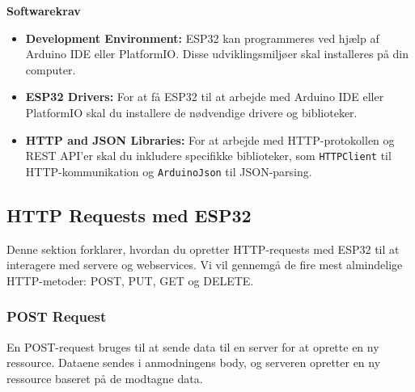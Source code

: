 \textbf{Softwarekrav}
\begin{itemize}
	\item \textbf{Development Environment:} ESP32 kan programmeres ved hjælp af Arduino IDE eller PlatformIO. Disse udviklingsmiljøer skal installeres på din computer.
	\item \textbf{ESP32 Drivers:} For at få ESP32 til at arbejde med Arduino IDE eller PlatformIO skal du installere de nødvendige drivere og biblioteker.
	\item \textbf{HTTP and JSON Libraries:} For at arbejde med HTTP-protokollen og REST API'er skal du inkludere specifikke biblioteker, som \texttt{HTTPClient} til HTTP-kommunikation og \texttt{ArduinoJson} til JSON-parsing.
\end{itemize}

\subsection*{HTTP Requests med ESP32}

Denne sektion forklarer, hvordan du opretter HTTP-requests med ESP32 til at interagere med servere og webservices. Vi vil gennemgå de fire mest almindelige HTTP-metoder: POST, PUT, GET og DELETE.

\subsubsection*{POST Request}
En POST-request bruges til at sende data til en server for at oprette en ny ressource. Dataene sendes i anmodningens body, og serveren opretter en ny ressource baseret på de modtagne data.

